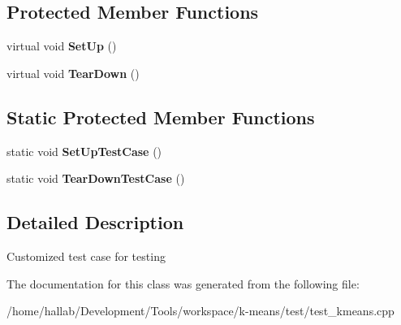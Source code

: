 \subsection*{Protected Member Functions}
\begin{DoxyCompactItemize}
\item 
\hypertarget{classKmeansTest_a342e848abba368f87b25a0e8c8a511d7}{virtual void {\bfseries Set\-Up} ()}\label{classKmeansTest_a342e848abba368f87b25a0e8c8a511d7}

\item 
\hypertarget{classKmeansTest_a16de3306d32ab3ece3766800ab01fae1}{virtual void {\bfseries Tear\-Down} ()}\label{classKmeansTest_a16de3306d32ab3ece3766800ab01fae1}

\end{DoxyCompactItemize}
\subsection*{Static Protected Member Functions}
\begin{DoxyCompactItemize}
\item 
\hypertarget{classKmeansTest_a5374fc1586536e197b55fd620b3bb2cb}{static void {\bfseries Set\-Up\-Test\-Case} ()}\label{classKmeansTest_a5374fc1586536e197b55fd620b3bb2cb}

\item 
\hypertarget{classKmeansTest_a4e7430b8838dcfbd3f1dab67abd0e466}{static void {\bfseries Tear\-Down\-Test\-Case} ()}\label{classKmeansTest_a4e7430b8838dcfbd3f1dab67abd0e466}

\end{DoxyCompactItemize}


\subsection{Detailed Description}
Customized test case for testing 

The documentation for this class was generated from the following file\-:\begin{DoxyCompactItemize}
\item 
/home/hallab/\-Development/\-Tools/workspace/k-\/means/test/test\-\_\-kmeans.\-cpp\end{DoxyCompactItemize}
